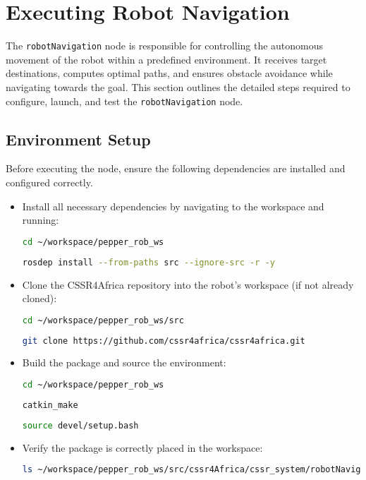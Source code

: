 \documentclass{CSSRforAfrica}
\begin{document}
\newpage

\section{Executing Robot Navigation}
The \verb|robotNavigation| node is responsible for controlling the autonomous movement of the robot within a predefined environment. It receives target destinations, computes optimal paths, and ensures obstacle avoidance while navigating towards the goal. This section outlines the detailed steps required to configure, launch, and test the \verb|robotNavigation| node.

\subsection{Environment Setup}
Before executing the node, ensure the following dependencies are installed and configured correctly.
\begin{itemize}
\item Install all necessary dependencies by navigating to the workspace and running:
\begin{lstlisting}[style=withoutNumbering, language=bash]
cd ~/workspace/pepper_rob_ws
\end{lstlisting}
\begin{lstlisting}[style=withoutNumbering, language=bash]
rosdep install --from-paths src --ignore-src -r -y
\end{lstlisting}

\item Clone the CSSR4Africa repository into the robot’s workspace (if not already cloned):
\begin{lstlisting}[style=withoutNumbering, language=bash]
cd ~/workspace/pepper_rob_ws/src
\end{lstlisting}
\begin{lstlisting}[style=withoutNumbering, language=bash]
git clone https://github.com/cssr4africa/cssr4africa.git
\end{lstlisting}

\item Build the package and source the environment:
\begin{lstlisting}[style=withoutNumbering, language=bash]
cd ~/workspace/pepper_rob_ws
\end{lstlisting}
\begin{lstlisting}[style=withoutNumbering, language=bash]
catkin_make
\end{lstlisting}
\begin{lstlisting}[style=withoutNumbering, language=bash]
source devel/setup.bash
\end{lstlisting}
\item Verify the package is correctly placed in the workspace:
\begin{lstlisting}[style=withoutNumbering, language=bash]
ls ~/workspace/pepper_rob_ws/src/cssr4Africa/cssr_system/robotNavigation
\end{lstlisting}
\end{itemize}
\end{document}
